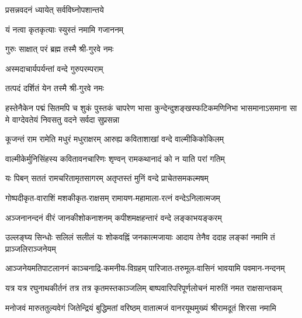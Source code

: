 
{प्रसन्नवदनं ध्यायेत् सर्वविघ्नोपशान्तये}

{यं नत्वा कृतकृत्याः स्युस्तं नमामि गजाननम्}


{गुरुः साक्षात् परं ब्रह्म तस्मै श्री-गुरवे नमः}

{अस्मदाचार्यपर्यन्तां वन्दे गुरुपरम्पराम्}

{तत्पदं दर्शितं येन तस्मै श्री-गुरवे नमः}

{हस्तेनैकेन पद्मं सितमपि च शुकं पुस्तकं चापरेण}
{भासा कुन्देन्दुशङ्खस्फटिकमणिनिभा भासमानाऽसमाना}
{सा मे वाग्देवतेयं निवसतु वदने सर्वदा सुप्रसन्ना}

\twolineshloka
{कूजन्तं राम रामेति मधुरं मधुराक्षरम्}
{आरुह्य कविताशाखां वन्दे वाल्मीकिकोकिलम्}

\twolineshloka
{वाल्मीकेर्मुनिसिंहस्य कवितावनचारिणः}
{शृण्वन् रामकथानादं को न याति परां गतिम्}

\twolineshloka
{यः पिबन् सततं रामचरितामृतसागरम्}
{अतृप्तस्तं मुनिं वन्दे प्राचेतसमकल्मषम्}

\resetShloka
{}

\twolineshloka
{गोष्पदीकृत-वाराशिं मशकीकृत-राक्षसम्}
{रामायण-महामाला-रत्नं वन्देऽनिलात्मजम्}

\twolineshloka
{अञ्जनानन्दनं वीरं जानकीशोकनाशनम्}
{कपीशमक्षहन्तारं वन्दे लङ्काभयङ्करम्}

\fourlineindentedshloka
{उल्लङ्घ्य सिन्धोः सलिलं सलीलं}
{यः शोकवह्निं जनकात्मजायाः}
{आदाय तेनैव ददाह लङ्कां}
{नमामि तं प्राञ्जलिराञ्जनेयम्}

\fourlineindentedshloka
{आञ्जनेयमतिपाटलाननं}
{काञ्चनाद्रि-कमनीय-विग्रहम्}
{पारिजात-तरुमूल-वासिनं}
{भावयामि पवमान-नन्दनम्}

\fourlineindentedshloka
{यत्र यत्र रघुनाथकीर्तनं}
{तत्र तत्र कृतमस्तकाञ्जलिम्}
{बाष्पवारिपरिपूर्णलोचनं}
{मारुतिं नमत राक्षसान्तकम्}

\fourlineindentedshloka
{मनोजवं मारुततुल्यवेगं}
{जितेन्द्रियं बुद्धिमतां वरिष्ठम्}
{वातात्मजं वानरयूथमुख्यं}
{श्रीरामदूतं शिरसा नमामि}

